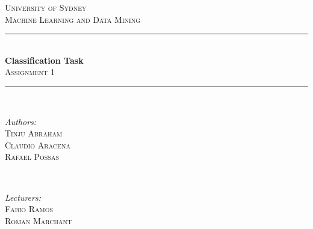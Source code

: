 \documentclass[letterpaper,10pt]{article}
\theoremstyle{mytheor}
\begin{document}
\begin{titlepage}

\newcommand{\HRule}{\rule{\linewidth}{0.5mm}} %

\center %
 

\textsc{\LARGE University of Sydney}\\[1.5cm] %

\textsc{\Large Machine Learning and Data Mining}\\[0.5cm] %


\HRule \\[0.4cm]
{ \huge \bfseries Classification Task}\\[0.4cm] %
\textsc{\Large Assignment 1}\\[0.5cm]
\HRule \\[1.5cm]
 

\begin{minipage}{0.4\textwidth}
\begin{flushleft} \large
\emph{Authors:}\\
\textsc{Tinju Abraham\\		
		Claudio Aracena\\
		Rafael Possas} %
\end{flushleft}
\end{minipage}
~
\begin{minipage}{0.4\textwidth}
\begin{flushright} \large
\emph{Lecturers:} \\
 \textsc{Fabio Ramos\\
 		 Roman Marchant} %
\end{flushright}
\end{minipage}\\[4cm]


\end{titlepage}
\end{document}
